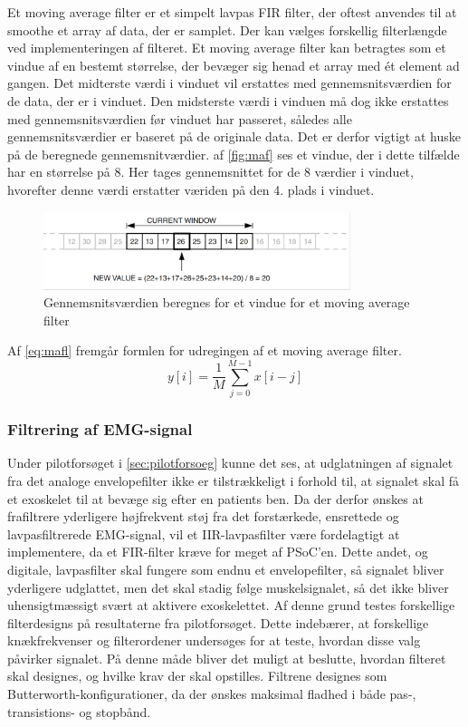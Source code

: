 \vspace{3mm}
\noindent
Et moving average filter er et simpelt lavpas FIR filter, der oftest anvendes til at smoothe et array af data, der er samplet. Der kan vælges forskellig filterlængde ved implementeringen af filteret. Et moving average filter kan betragtes som et vindue af en bestemt størrelse, der bevæger sig henad et array med ét element ad gangen. Det midterste værdi i vinduet vil  erstattes med gennemsnitsværdien for de data, der er i vinduet. Den midsterste værdi i vinduen må dog ikke erstattes med gennemsnitsværdien før vinduet har passeret, således alle gennemsnitsværdier er baseret på de originale data. Det er derfor vigtigt at huske på de beregnede gennemsnitværdier.  af \autoref{fig:maf} ses et vindue, der i dette tilfælde har en størrelse på 8. Her tages gennemsnittet for de 8 værdier i vinduet, hvorefter denne værdi erstatter væriden på den 4. plads i vinduet.\citep{atmel2002}

\begin{figure} [H]
\centering
\includegraphics[width=0.8\textwidth]{figures/maf}
\caption{Gennemsnitsværdien beregnes for et vindue for et moving average filter}
\label{fig:maf}
\end{figure} 

Af \autoref{eq:mafl} fremgår formlen for udregingen af et moving average filter. 
\begin{equation}
y[i]=\dfrac{1}{M}\sum^{M-1}_{j=0} x[i-j]
\label{eq:mafl}
\end{equation}

\subsubsection{Filtrering af EMG-signal}
Under pilotforsøget i \autoref{sec:pilotforsoeg} kunne det ses, at udglatningen af signalet fra det analoge envelopefilter ikke er tilstrækkeligt i forhold til, at signalet skal få et exoskelet til at bevæge sig efter en patients ben. Da der derfor ønskes at frafiltrere yderligere højfrekvent støj fra det forstærkede, ensrettede og lavpasfiltrerede EMG-signal, vil et IIR-lavpasfilter være fordelagtigt at implementere, da et FIR-filter kræve for meget af PSoC'en. Dette andet, og digitale, lavpasfilter skal fungere som endnu et envelopefilter, så signalet bliver yderligere udglattet, men det skal stadig følge muskelsignalet, så det ikke bliver uhensigtmæssigt svært at aktivere exoskelettet.  
Af denne grund testes forskellige filterdesigns på resultaterne fra pilotforsøget. Dette indebærer, at forskellige knækfrekvenser og filterordener undersøges for at teste, hvordan disse valg påvirker signalet. På denne måde bliver det muligt at beslutte, hvordan filteret skal designes, og hvilke krav der skal opstilles. Filtrene designes som Butterworth-konfigurationer, da der ønskes maksimal fladhed i både pas-, transistions- og stopbånd. 

